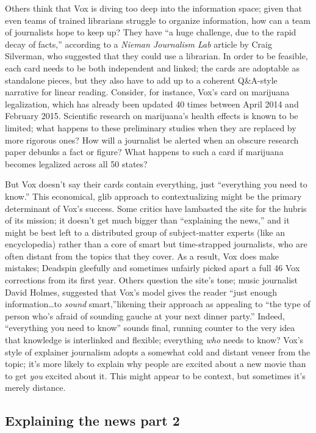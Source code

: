 Others think that Vox is diving too deep into the information space; given that even teams of trained librarians struggle to organize information, how can a team of journalists hope to keep up? They have ``a huge challenge, due to the rapid decay of facts,'' according to a \emph{Nieman Journalism Lab} article by Craig Silverman, who suggested that they could use a librarian.\autocite{} In order to be feasible, each card needs to be both independent and linked; the cards are adoptable as standalone pieces, but they also have to add up to a coherent Q\&A-style narrative for linear reading. Consider, for instance, Vox's card on marijuana legalization, which has already been updated 40 times between April 2014 and February 2015.\autocite{} Scientific research on marijuana's health effects is known to be limited; what happens to these preliminary studies when they are replaced by more rigorous ones? How will a journalist be alerted when an obscure research paper debunks a fact or figure? What happens to such a card if marijuana becomes legalized across all 50 states?

But Vox doesn't say their cards contain everything, just ``everything you need to know.'' This economical, glib approach to contextualizing might be the primary determinant of Vox's success. Some critics have lambasted the site for the hubris of its mission; it doesn't get much bigger than ``explaining the news,'' and it might be best left to a distributed group of subject-matter experts (like an encyclopedia) rather than a core of smart but time-strapped journalists, who are often distant from the topics that they cover. As a result, Vox does make mistakes; Deadspin gleefully and sometimes unfairly picked apart a full 46 Vox corrections from its first year.\autocite{} Others question the site's tone; music journalist David Holmes, suggested that Vox's model gives the reader ``just enough information\ldots to \emph{sound} smart,''likening their approach as appealing to ``the type of person who's afraid of sounding gauche at your next dinner party.''\autocite{} Indeed, ``everything you need to know'' sounds final, running counter to the very idea that knowledge is interlinked and flexible; everything \emph{who} needs to know? Vox's style of explainer journalism adopts a somewhat cold and distant veneer from the topic; it's more likely to explain why people are excited about a new movie than to get \emph{you} excited about it. This might appear to be context, but sometimes it's merely distance.

\subsection{Explaining the news part 2}

